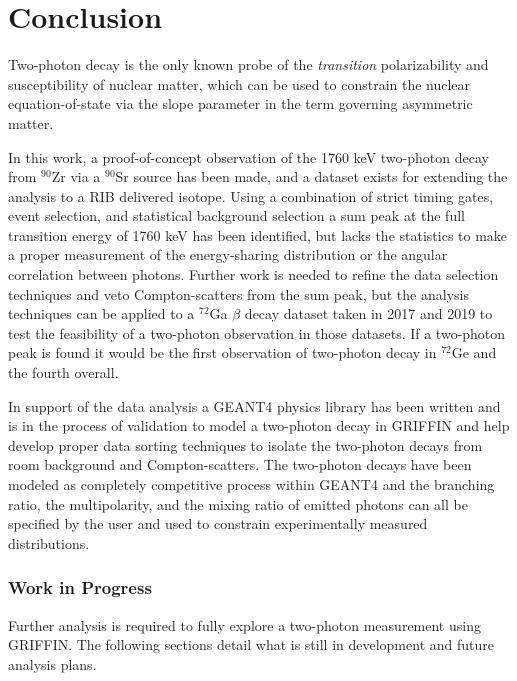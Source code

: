 \documentclass[cnatzke_thesis_proposal.tex]{subfiles}
\begin{document}
\chapter{Conclusion}

Two-photon decay is the only known probe of the \textit{transition} polarizability and susceptibility of nuclear matter, which can be used to constrain the nuclear equation-of-state via the slope parameter in the term governing asymmetric matter. 

In this work, a proof-of-concept observation of the 1760 keV two-photon decay from $^{90}$Zr via a $^{90}$Sr source has been made, and a dataset exists for extending the analysis to a RIB delivered isotope. 
Using a combination of strict timing gates, event selection, and statistical background selection a sum peak at the full transition energy of 1760 keV has been identified, but lacks the statistics to make a proper measurement of the energy-sharing distribution or the angular correlation between photons.
Further work is needed to refine the data selection techniques and veto Compton-scatters from the sum peak, but the analysis techniques can be applied to a $^{72}$Ga $\beta$ decay dataset taken in 2017 and 2019 to test the feasibility of a two-photon observation in those datasets. 
If a two-photon peak is found it would be the first observation of two-photon decay in $^{72}$Ge and the fourth overall. 

In support of the data analysis a GEANT4 physics library has been written and is in the process of validation to model a two-photon decay in GRIFFIN and help develop proper data sorting techniques to isolate the two-photon decays from room background and Compton-scatters. 
The two-photon decays have been modeled as completely competitive process within GEANT4 and the branching ratio, the multipolarity, and the mixing ratio of emitted photons can all be specified by the user and used to constrain experimentally measured distributions. 



\subsection{Work in Progress}
Further analysis is required to fully explore a two-photon measurement using GRIFFIN. 
The following sections detail what is still in development and future analysis plans. 

\end{document}
